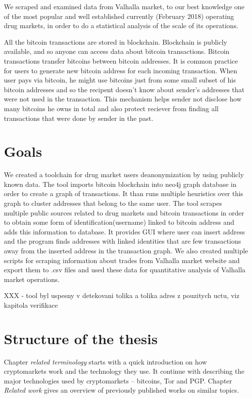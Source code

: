 \documentclass[
  digital, %
  table,   %
  lof,     %
  lot,     %
  oneside
]{fithesis3}
\begin{document}
We scraped and examined data from Valhalla market,
 to our best knowledge one of the most popular and well established currently (February 2018) operating drug markets,
in order to do a statistical analysis of the scale of its operations.

All the bitcoin transactions are stored in blockchain. Blockchain is
publicly available, and so anyone can access data about bitcoin transactions.
Bitcoin transactions transfer bitcoins between bitcoin addresses. It is common practice for users
to generate new bitcoin address for each incoming transaction.
When user pays via bitcoin, he might use bitcoins just from some small subset of his bitcoin addresses
and so the recipent doesn't know about sender's addresses that were not used in the transaction.
This mechanism helps sender not disclose how many bitcoins he owns in total and also
protect reciever from finding all transactions that were done by sender in the past.

\section{Goals}

We created a toolchain for drug market users deanonymization by using publicly known data.
The tool imports bitcoin blockchain into neo4j graph database in order to create a graph of transactions.
It than runs multiple heuristics over this graph to cluster addresses that belong to the same user.
The tool scrapes multiple public sources related to drug markets and bitcoin transactions in order
to obtain some form of identification(username) linked to bitcoin address and adds this information to database.
It provides GUI where user can insert address and the program finds addresses with linked identities
that are few transactions away from the inserted address in the transaction graph.
We also created multiple scripts for scraping information about trades from Valhalla market website
and export them to .csv files and used these data for quantitative analysis of Valhalla market operations.

XXX - tool byl uspesny v detekovani tolika a tolika adres z pouzitych uctu, viz kapitola verifikace

\section{Structure of the thesis}
Chapter \emph{related terminology} starts with a quick introduction
on how cryptomarkets work and the technology they use.
It continue with describing the major technologies used by cryptomarkets -- bitcoins, Tor and PGP.
Chapter \emph{Related work} gives an overview of previously published works on similar topics. 
\end{document}
